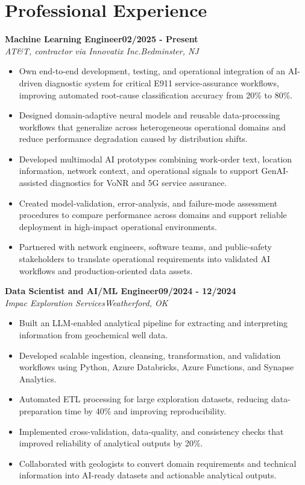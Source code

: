 \documentclass[9pt,letterpaper]{extarticle}
\newcommand{\role}[4]{%
  \Needspace{4\baselineskip}\textbf{#1}\hfill\textbf{#2}\\[-1pt]
  \textit{#3}\hfill\textit{#4}\par}
\begin{document}
\section{Professional Experience}
\role{Machine Learning Engineer}{02/2025 - Present}{AT\&T, contractor via Innovatix Inc.}{Bedminster, NJ}
\begin{itemize}
\item Own end-to-end development, testing, and operational integration of an AI-driven diagnostic system for critical E911 service-assurance workflows, improving automated root-cause classification accuracy from 20\% to 80\%.
\item Designed domain-adaptive neural models and reusable data-processing workflows that generalize across heterogeneous operational domains and reduce performance degradation caused by distribution shifts.
\item Developed multimodal AI prototypes combining work-order text, location information, network context, and operational signals to support GenAI-assisted diagnostics for VoNR and 5G service assurance.
\item Created model-validation, error-analysis, and failure-mode assessment procedures to compare performance across domains and support reliable deployment in high-impact operational environments.
\item Partnered with network engineers, software teams, and public-safety stakeholders to translate operational requirements into validated AI workflows and production-oriented data assets.
\end{itemize}
\role{Data Scientist and AI/ML Engineer}{09/2024 - 12/2024}{Impac Exploration Services}{Weatherford, OK}
\begin{itemize}
\item Built an LLM-enabled analytical pipeline for extracting and interpreting information from geochemical well data.
\item Developed scalable ingestion, cleansing, transformation, and validation workflows using Python, Azure Databricks, Azure Functions, and Synapse Analytics.
\item Automated ETL processing for large exploration datasets, reducing data-preparation time by 40\% and improving reproducibility.
\item Implemented cross-validation, data-quality, and consistency checks that improved reliability of analytical outputs by 20\%.
\item Collaborated with geologists to convert domain requirements and technical information into AI-ready datasets and actionable analytical outputs.
\end{itemize}
\end{document}
